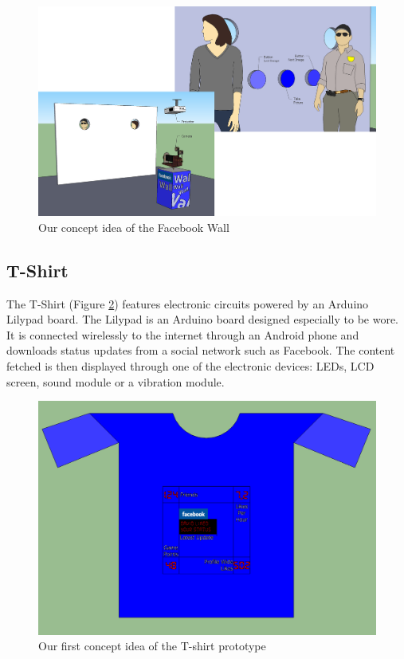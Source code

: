 \begin{figure}[h!]
\centering \includegraphics[scale=0.22]{img/prestudies-facebookwall}
\caption{Our concept idea of the Facebook Wall}
\label{fig:prestudies-facebookwall}
\end{figure}

\newpage

\subsection{T-Shirt}
The T-Shirt (Figure \ref{fig:prestudies-tshirt})  features electronic circuits powered by an Arduino Lilypad board.
The Lilypad is an Arduino board designed especially to be wore. It is connected wirelessly to the internet through
an Android phone and downloads status updates from a social network such as Facebook.
The content fetched is then displayed through one of the electronic devices: LEDs, LCD screen,
sound module or a vibration module.

\begin{figure}[h!]
\centering \includegraphics[scale=0.35]{img/prestudies-tshirt}
\caption{Our first concept idea of the T-shirt prototype}
\label{fig:prestudies-tshirt}
\end{figure}

